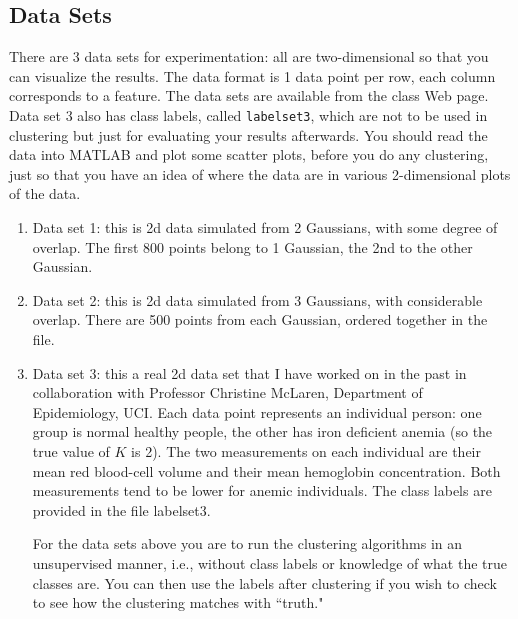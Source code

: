 \documentclass[11pt,psfig]{article}
\begin{document}
\subsection*{Data Sets} There are 3 data sets for
experimentation: all are two-dimensional so that you can
visualize the results. The data format is 1 data point per row, each column
corresponds to a feature. The data sets are available from the class Web page.
Data set 3 also has class labels, called {\tt labelset3},
 which are not to be used in clustering but just for evaluating
your results afterwards.  You should
 read the data into MATLAB and plot some scatter
plots, before you do any clustering, just so that you have an idea of where the
data are in various 2-dimensional plots of the data. 
\begin{enumerate}
\item Data set 1: this is 2d data simulated from 2 Gaussians, with
some degree of overlap. The first 800 points belong to 1 Gaussian,
the 2nd to the other Gaussian.

\item Data set 2: this is 2d data simulated from 3 Gaussians, with
considerable overlap. There are 500 points from each Gaussian,
ordered together in the file.

\item Data set 3: this a real 2d data set that I have worked on in the past in collaboration with Professor
Christine McLaren, Department of Epidemiology, UCI. Each data point represents
an individual person: one group is normal healthy people, the other has iron
deficient anemia (so the true value of $K$ is 2). The two measurements on each
individual are their mean red blood-cell volume and their mean hemoglobin
concentration.  Both measurements tend to be lower for anemic individuals. The
class labels are provided in the file labelset3. 


For the data sets above you are to run the clustering
algorithms in an unsupervised manner, i.e., without class labels or knowledge of what the true classes are. 
You can then
use the labels after clustering if you wish to check to see how the clustering
matches with ``truth."


\end{enumerate}
\end{document}
